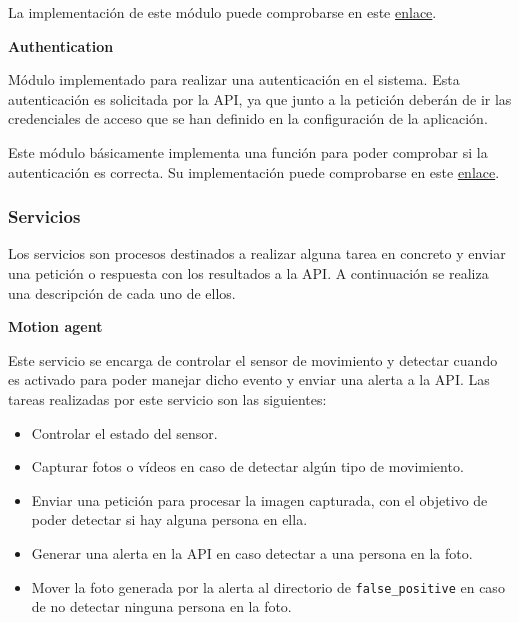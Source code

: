 \vspace{-0.5cm}

La implementación de este módulo puede comprobarse en este \href{https://github.com/jmv74211/TFM_security_system_PI/blob/master/src/modules/video.py}{enlace}.

\textbf{Authentication} 

Módulo implementado para realizar una autenticación en el sistema. Esta autenticación es solicitada por la API, ya que junto a la petición deberán de ir las credenciales de acceso que se han definido en la configuración de la aplicación.

Este módulo básicamente implementa una función para poder comprobar si la autenticación es correcta. Su implementación puede comprobarse en este \href{https://github.com/jmv74211/TFM_security_system_PI/blob/master/src/modules/authentication.py}{enlace}.

\subsubsection{Servicios}

Los servicios son procesos destinados a realizar alguna tarea en concreto y enviar una petición o respuesta con los resultados a la API. A continuación se realiza una descripción de cada uno de ellos.

\textbf{Motion agent}

Este servicio se encarga de controlar el sensor de movimiento y detectar cuando es activado para poder manejar dicho evento y enviar una alerta a la API. Las tareas realizadas por este servicio son las siguientes:

\vspace{-0.5cm}

\begin{itemize}
\item Controlar el estado del sensor.
\item Capturar fotos o vídeos en caso de detectar algún tipo de movimiento.
\item Enviar una petición para procesar la imagen capturada, con el objetivo de poder detectar si hay alguna persona en ella.
\item Generar una alerta en la API en caso detectar a una persona en la foto.
\item Mover la foto generada por la alerta al directorio de \texttt{false\_positive} en caso de no detectar ninguna persona en la foto.

\end{itemize}

